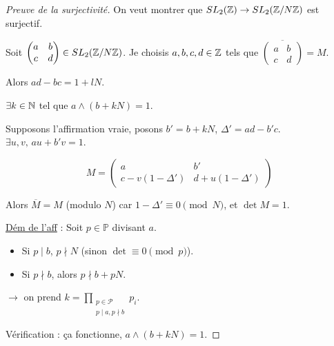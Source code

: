 \begin{proof}[Preuve de la surjectivité]
    On veut montrer que $SL_2(\mathbb{Z}) \to SL_2(\mathbb{Z}/N\mathbb{Z})$ est surjectif.

    Soit $\begin{pmatrix} a & b \\ c & d \end{pmatrix} \in SL_2(\mathbb{Z}/N\mathbb{Z})$. Je choisis $a, b, c, d \in \mathbb{Z}$ tels que $\overline{\begin{pmatrix} a & b \\ c & d \end{pmatrix}} = M$.
    
    Alors $ad - bc = 1 + lN$.

     $\exists k \in \mathbb{N}$ tel que $a \wedge (b+kN) = 1$.

    Supposons l'affirmation vraie, posons $b' = b + kN$, $\Delta' = ad - b'c$. \\
    $\exists u, v, \, au + b'v = 1$.
    
    \[ M = \begin{pmatrix} a & b' \\ c - v(1-\Delta') & d + u(1-\Delta') \end{pmatrix} \]
    
    Alors $\overline{M} = M$ (modulo $N$) car $1-\Delta' \equiv 0 \pmod N$, et $\det M = 1$.

    \lvspace
    \uline{Dém de l'aff} : Soit $p \in \mathbb{P}$ divisant $a$.
    \begin{itemize}
        \item Si $p \mid b$, $p \nmid N$ (sinon $\det \equiv 0 \pmod p$).
        \item Si $p \nmid b$, alors $p \nmid b+pN$.
    \end{itemize}
    $\to$ on prend $k = \prod_{\substack{p \in \mathcal P \\ p \mid a, p \nmid b}} p_i$.
    
    Vérification : ça fonctionne, $a \wedge (b+kN) = 1$.
\end{proof}